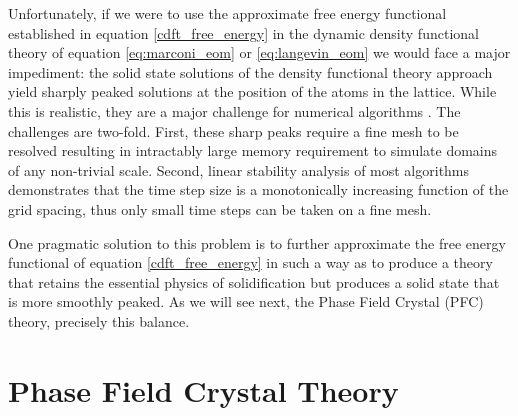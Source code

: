 Unfortunately, if we were to use the approximate free energy functional
established in equation \ref{cdft_free_energy} in the dynamic density
functional theory of equation \ref{eq:marconi_eom} or \ref{eq:langevin_eom} we
would face a major impediment: the solid state solutions of the density
functional theory approach yield sharply peaked solutions at the position of
the atoms in the lattice. While this is realistic, they are a major challenge
for numerical algorithms . 
The challenges are two-fold. First, these sharp peaks
require a fine mesh to be resolved resulting in intractably large memory requirement to
simulate domains of any non-trivial scale. Second, linear stability analysis
of most algorithms demonstrates that the time step size is a monotonically 
increasing function of the grid spacing, thus only small time steps can be taken
on a fine mesh. 

One pragmatic solution to this problem is to further approximate the free
energy functional of equation \ref{cdft_free_energy} in such a way as to
produce a theory that retains the essential physics of solidification but
produces a solid state that is more smoothly peaked. As we will see next,
the Phase Field Crystal (PFC) theory,  precisely this balance.

\section{Phase Field Crystal Theory} %

